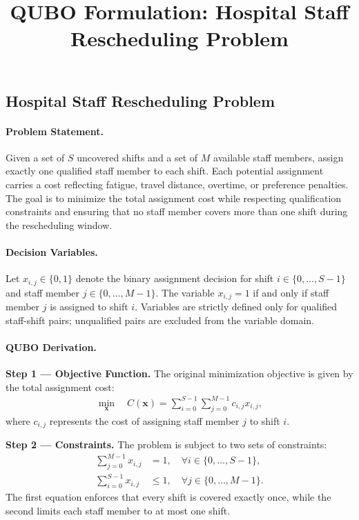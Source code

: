\documentclass[12pt]{article}
\title{QUBO Formulation: Hospital Staff Rescheduling Problem}
\date{}
\begin{document}
\maketitle

\subsection*{Hospital Staff Rescheduling Problem}

\paragraph{Problem Statement.}
Given a set of $S$ uncovered shifts and a set of $M$ available staff members, assign exactly one qualified staff member to each shift. Each potential assignment carries a cost reflecting fatigue, travel distance, overtime, or preference penalties. The goal is to minimize the total assignment cost while respecting qualification constraints and ensuring that no staff member covers more than one shift during the rescheduling window.

\paragraph{Decision Variables.}
Let $x_{i,j} \in \{0,1\}$ denote the binary assignment decision for shift $i \in \{0,\dots,S-1\}$ and staff member $j \in \{0,\dots,M-1\}$. The variable $x_{i,j} = 1$ if and only if staff member $j$ is assigned to shift $i$. Variables are strictly defined only for qualified staff-shift pairs; unqualified pairs are excluded from the variable domain.

\paragraph{QUBO Derivation.}
\textbf{Step 1 --- Objective Function.} The original minimization objective is given by the total assignment cost:
\begin{align}
  \min_{\mathbf{x}} \quad C(\mathbf{x}) = \sum_{i=0}^{S-1} \sum_{j=0}^{M-1} c_{i,j} x_{i,j},
\end{align}
where $c_{i,j}$ represents the cost of assigning staff member $j$ to shift $i$.

\textbf{Step 2 --- Constraints.} The problem is subject to two sets of constraints:
\begin{align}
  \sum_{j=0}^{M-1} x_{i,j} &= 1, \quad \forall i \in \{0,\dots,S-1\}, \\
  \sum_{i=0}^{S-1} x_{i,j} &\le 1, \quad \forall j \in \{0,\dots,M-1\}.
\end{align}
The first equation enforces that every shift is covered exactly once, while the second limits each staff member to at most one shift.
\end{document}
